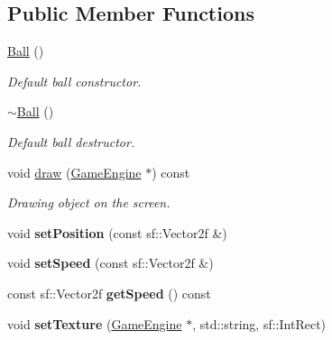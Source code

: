 \subsection*{Public Member Functions}
\begin{DoxyCompactItemize}
\item 
\mbox{\label{class_ball_a86a144d3dad6c953e422e32435923bbb}} 
\mbox{\hyperlink{class_ball_a86a144d3dad6c953e422e32435923bbb}{Ball}} ()
\begin{DoxyCompactList}\small\item\em Default ball constructor. \end{DoxyCompactList}\item 
\mbox{\label{class_ball_a20f2f6ac0bf648f406a8e12e63429fcd}} 
\mbox{\hyperlink{class_ball_a20f2f6ac0bf648f406a8e12e63429fcd}{$\sim$\+Ball}} ()
\begin{DoxyCompactList}\small\item\em Default ball destructor. \end{DoxyCompactList}\item 
\mbox{\label{class_ball_a278c50c66e8ea81f2178328022d742ff}} 
void \mbox{\hyperlink{class_ball_a278c50c66e8ea81f2178328022d742ff}{draw}} (\mbox{\hyperlink{class_game_engine}{Game\+Engine}} $\ast$) const
\begin{DoxyCompactList}\small\item\em Drawing object on the screen. \end{DoxyCompactList}\item 
\mbox{\label{class_ball_af2260b5f0b9b20d4974ada97481004f3}} 
void {\bfseries set\+Position} (const sf\+::\+Vector2f \&)
\item 
\mbox{\label{class_ball_ad82f5f35eaf987d5c2b0faabd06989c5}} 
void {\bfseries set\+Speed} (const sf\+::\+Vector2f \&)
\item 
\mbox{\label{class_ball_a9986943aa6685d80f65d441dd68c2e69}} 
const sf\+::\+Vector2f {\bfseries get\+Speed} () const
\item 
\mbox{\label{class_ball_a9ac324bd0e233a1baf7ccb9eee5d05ca}} 
void {\bfseries set\+Texture} (\mbox{\hyperlink{class_game_engine}{Game\+Engine}} $\ast$, std\+::string, sf\+::\+Int\+Rect)

\end{DoxyCompactItemize}
